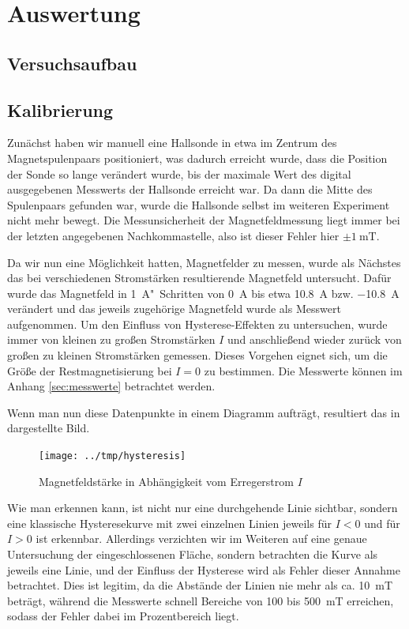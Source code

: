 \section{Auswertung}
\subsection{Versuchsaufbau}

\subsection{Kalibrierung}
Zunächst haben wir manuell eine Hallsonde in etwa im Zentrum des
Magnetspulenpaars positioniert, was dadurch erreicht wurde, dass die Position
der Sonde so lange verändert wurde, bis der maximale Wert des digital
ausgegebenen Messwerts der Hallsonde erreicht war. Da dann die Mitte des
Spulenpaars gefunden war, wurde die Hallsonde selbst im weiteren Experiment
nicht mehr bewegt. Die Messunsicherheit der Magnetfeldmessung liegt immer bei
der letzten angegebenen Nachkommastelle, also ist dieser Fehler hier $\pm
\SI{1}{\milli\tesla}$.

Da wir nun eine Möglichkeit hatten, Magnetfelder zu messen, wurde als Nächstes
das bei verschiedenen Stromstärken resultierende Magnetfeld untersucht. Dafür
wurde das Magnetfeld in \SI{1}{\ampere}"~Schritten von \SI{0}{\ampere} bis etwa
\SI{10,8}{\ampere} bzw.
\SI{-10,8}{\ampere} verändert und das jeweils
zugehörige Magnetfeld wurde als Messwert aufgenommen. Um den Einfluss von
Hysterese-Effekten zu untersuchen, wurde immer von kleinen zu großen
Stromstärken $I$ und anschließend wieder zurück von großen zu kleinen
Stromstärken gemessen. Dieses Vorgehen eignet sich, um die Größe der
Restmagnetisierung bei $I=0$ zu bestimmen. Die Messwerte können im Anhang
\ref{sec:messwerte} betrachtet werden. 

Wenn man nun diese Datenpunkte in einem Diagramm aufträgt, resultiert das in
 dargestellte Bild.

\begin{figure}[htb]
   \centering
   \texttt{[image: ../tmp/hysteresis]}
   \caption{Magnetfeldstärke in Abhängigkeit vom Erregerstrom $I$}
   \label{fig:hysterese}
\end{figure}

Wie man erkennen kann, ist nicht nur eine durchgehende Linie sichtbar, sondern
eine klassische Hysteresekurve mit zwei einzelnen Linien jeweils für $I<0$ und
für $I>0$ ist erkennbar. Allerdings verzichten wir im Weiteren auf eine genaue
Untersuchung der eingeschlossenen Fläche, sondern betrachten die Kurve als
jeweils eine Linie, und der Einfluss der Hysterese wird als Fehler dieser
Annahme betrachtet. Dies ist legitim, da die Abstände der Linien nie mehr als
ca. \SI{10}{\milli\tesla} beträgt, während die Messwerte schnell Bereiche von
100 bis \SI{500}{\milli\tesla} erreichen, sodass der Fehler dabei im
Prozentbereich liegt.

